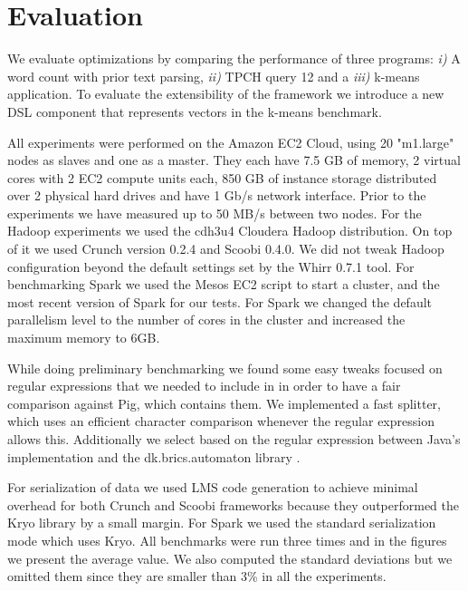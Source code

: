 \section{Evaluation}
\label{sec:evaluation}

We evaluate \tool optimizations by comparing the performance of three programs: \emph{i)} A word count with prior text parsing, \emph{ii)} TPCH \cite{tpch} query 12 and a  \emph{iii)} k-means application. To evaluate the extensibility of the framework we introduce a new DSL component that represents vectors in the k-means benchmark.

All experiments were performed on the Amazon EC2 Cloud, using 20 "m1.large" nodes as slaves and one as a master. They each have 7.5 GB of memory, 2 virtual cores with 2 EC2 compute units each, 850 GB of instance storage distributed over 2 physical hard drives and have 1 Gb/s network interface. Prior to the experiments we have measured up to 50 MB/s between two nodes. For the Hadoop experiments we used the cdh3u4 Cloudera Hadoop distribution. On top of it we used Crunch version 0.2.4 and Scoobi 0.4.0. We did not tweak Hadoop configuration beyond the default settings set by the Whirr 0.7.1 \cite{whirr} tool. For benchmarking Spark we used the Mesos \cite{hindman_mesos:_2011} EC2 script to start a cluster, and the most recent version of Spark for our tests. For Spark we changed the default parallelism level to the number of cores in the cluster and increased the maximum memory to 6GB. 

While doing preliminary benchmarking we found some easy tweaks focused on regular expressions that we needed to include in \tool in order to have a fair comparison against Pig, which contains them. We implemented a fast splitter, which uses an efficient character comparison whenever the regular expression allows this. Additionally we select based on the regular expression between Java's implementation and the dk.brics.automaton library \cite{mollerdk}.

For serialization of data we used LMS code generation to achieve minimal overhead for both Crunch and Scoobi frameworks because they outperformed the Kryo \cite{ kryo} library by a small margin. For Spark we used the standard serialization mode which uses Kryo. All benchmarks were run three times and in the figures we present the average value. We also computed the standard deviations but we omitted them since they are smaller than 3\% in all the experiments.

